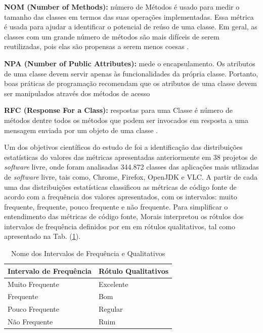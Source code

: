  \vspace{\onelineskip} 

\textbf{NOM (Number of Methods):} número de Métodos é usado para medir o tamanho
das classes em termos das suas operações implementadas. Essa métrica é usada para
ajudar a identificar o potencial de reúso de uma classe. Em geral, as classes com
um grande número de métodos são mais difíceis de serem reutilizadas, pois elas são
propensas a serem menos coesas \cite{Lorenz94}.


 \vspace{\onelineskip} 

\textbf{NPA (Number of Public Attributes):}  mede o encapsulamento. Os atributos de uma classe devem servir apenas às funcionalidades da própria classe. Portanto, boas práticas de programação recomendam que os atributos de uma classe devem ser manipulados através dos métodos de acesso \cite{beck1997smalltalk}



 \vspace{\onelineskip} 

\textbf{RFC (Response For a Class):} respostas para uma Classe é número de métodos
dentre todos os métodos que podem ser invocados em resposta a uma mensagem
enviada por um objeto de uma classe \cite{Sharble93}.



 \vspace{\onelineskip} 

Um dos objetivos científicos do estudo de  foi a identificação das distribuições estatísticas do valores das métricas apresentadas anteriormente em 38 projetos de \textit{software} livre, onde foram analisadas 344.872 classes das aplicações mais utlizadas de \textit{software} livre, tais como, Chrome, Firefox, OpenJDK e VLC. A partir de cada uma das distribuições estatísticas  classificou as métricas de código fonte de acordo com a frequência dos valores apresentados,
com os intervalos: muito frequente, frequente, pouco frequente e não frequente. Para simplificar o entendimento das métricas de código fonte, Morais interpretou os rótulos dos
intervalos de frequência definidos por  em em rótulos qualitativos, tal como apresentado na Tab. (\ref{nomes}). 

\begin{table}[!ht]
	\begin{center}
	 \begin{tabular}{|l|l|}
		\hline
		\textbf{Intervalo de Frequência} & \textbf{Rótulo Qualitativos} \\ \hline
		Muito Frequente & Excelente \\ \hline
		Frequente       & Bom       \\ \hline
		Pouco Frequente & Regular   \\ \hline
		Não Frequente   & Ruim      \\ \hline
		\end{tabular}
		\caption{Nome dos Intervalos de Frequência e Qualitativos}
		\label{nomes}
		\end{center}
		\end{table}


